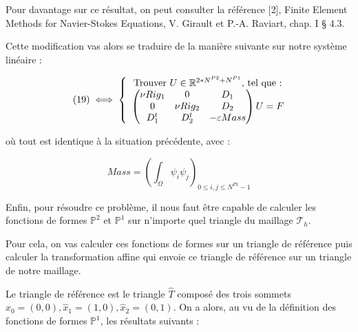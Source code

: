 \documentclass[a4paper,12pt]{article}
\begin{document}
Pour davantage sur ce résultat, on peut consulter la référence [2], Finite Element Methods for Navier-Stokes Equations, V. Girault
et P.-A. Raviart, chap. I § 4.3.

Cette modification vas alors se traduire de la manière suivante sur notre système linéaire :

\begin{equation}
(19) \iff \left \{
\begin{array}{c @{} c}
\text{Trouver } U \in \mathbb{R}^{2*N^{P2}+N^{P1}} \text{, tel que :} \\
\begin{pmatrix}
\nu Rig_{1} & 0 & D_{1} \\
0 & \nu Rig_{2} & D_{2} \\
D_{1}^{t} & D_{2}^{t} & -\varepsilon Mass \\
\end{pmatrix} U = F\\
\end{array}
\right.
\end{equation}

où tout est identique à la situation précédente, avec :

\begin{equation}
Mass = \left( \int_{\Omega} \psi_{i} \psi_{j} \right)_{0 \leq i,j \leq N^{P1}-1}
\end{equation}

Enfin, pour résoudre ce problème, il nous faut être capable de calculer les fonctions de formes $\mathbb{P}^2$ et $\mathbb{P}^1$ sur n'importe quel triangle du maillage $\mathcal{T}_{h}$.

Pour cela, on vas calculer ces fonctions de formes sur un triangle de référence puis calculer la transformation affine qui envoie ce triangle de référence sur un triangle de notre maillage.

Le triangle de référence est le triangle $\widehat{T}$ composé des trois sommets $\widehat{x}_{0} = (0,0) , \widehat{x}_{1} = (1,0) , \widehat{x}_{2} = (0,1)$.
On a alors, au vu de la définition des fonctions de formes $\mathbb{P}^{1}$, les résultats suivants :
\end{document}
